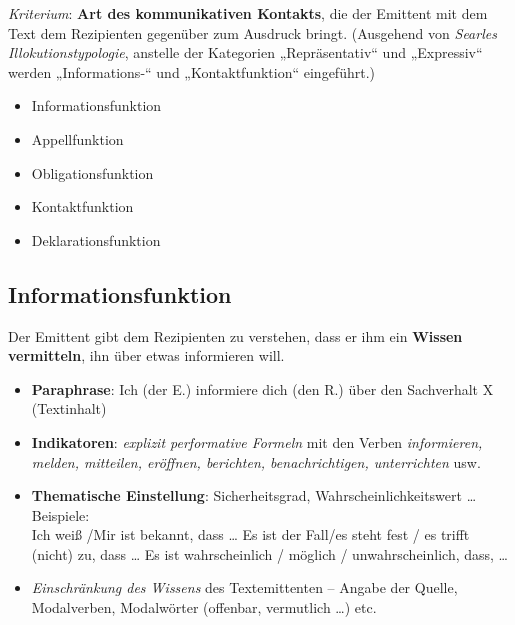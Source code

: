 \documentclass[
  letterpaper,
]{scrbook}
\providecommand{\tightlist}{%
  \setlength{\itemsep}{0pt}\setlength{\parskip}{0pt}}\usepackage{longtable,booktabs,array}
\begin{document}
\emph{Kriterium}: \textbf{Art des kommunikativen Kontakts}, die der
Emittent mit dem Text dem Rezipienten gegenüber zum Ausdruck bringt.
(Ausgehend von \emph{Searles Illokutionstypologie}, anstelle der
Kategorien „Repräsentativ`` und „Expressiv`` werden „Informations-`` und
„Kontaktfunktion`` eingeführt.)

\begin{itemize}
\tightlist
\item
  Informationsfunktion\\
\item
  Appellfunktion\\
\item
  Obligationsfunktion\\
\item
  Kontaktfunktion\\
\item
  Deklarationsfunktion\\
\end{itemize}

\hypertarget{informationsfunktion}{%
\subsection{Informationsfunktion}\label{informationsfunktion}}

Der Emittent gibt dem Rezipienten zu verstehen, dass er ihm ein
\textbf{Wissen vermitteln}, ihn über etwas informieren will.

\begin{itemize}
\item
  \textbf{Paraphrase}: Ich (der E.) informiere dich (den R.) über den
  Sachverhalt X (Textinhalt)
\item
  \textbf{Indikatoren}: \emph{explizit performative Formeln} mit den
  Verben \emph{informieren, melden, mitteilen, eröffnen, berichten,
  benachrichtigen, unterrichten} usw.
\item
  \textbf{Thematische Einstellung}: Sicherheitsgrad,
  Wahrscheinlichkeitswert \ldots{}\\
  Beispiele:\\
  Ich weiß /Mir ist bekannt, dass \ldots{} Es ist der Fall/es steht fest
  / es trifft (nicht) zu, dass \ldots{} Es ist wahrscheinlich / möglich
  / unwahrscheinlich, dass, \ldots{}
\item
  \emph{Einschränkung des Wissens} des Textemittenten -- Angabe der
  Quelle, Modalverben, Modalwörter (offenbar, vermutlich \ldots) etc.
\end{itemize}
\end{document}
